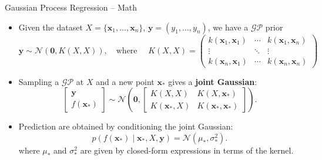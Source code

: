 \documentclass[9pt]{beamer}
\begin{document}
\begin{frame}{Gaussian Process Regression -- Math}
	\begin{itemize}
	\setlength{\itemsep}{1.4em}
	\item Given the dataset $X = \{\mathbf{x}_1,\ldots,\mathbf{x}_n\}$, $\mathbf{y} = (y_1, \ldots, y_n)$, we have a $\mathcal{GP}$ prior
		\[
			\mathbf{y} \sim \mathcal{N}(\mathbf{0}, K(X,X)), \quad \text{where } \quad
			K(X,X) = \begin{pmatrix}
				k(\mathbf{x}_1, \mathbf{x}_1) & \cdots & k(\mathbf{x}_1, \mathbf{x}_n) \\
				\vdots & \ddots & \vdots \\
				k(\mathbf{x}_n, \mathbf{x}_1) & \cdots & k(\mathbf{x}_n, \mathbf{x}_n)
			\end{pmatrix} 
		\]
	\item Sampling a $\mathcal{GP}$ at $X$ and a new point $\mathbf{x}_*$ gives a \textbf{joint Gaussian}:
		\[
		\begin{bmatrix}
		\mathbf{y} \\
		f(\mathbf{x}_*)
		\end{bmatrix}
		\sim
		\mathcal{N}
		\left(
		\mathbf{0},
		\begin{bmatrix}
			K(X,X) & K(X,\mathbf{x}_*) \\
			K(\mathbf{x}_*,X) & K(\mathbf{x}_*,\mathbf{x}_*)
		\end{bmatrix}
		\right).
		\]
	\item Prediction are obtained by conditioning the joint Gaussian:
	\[
		p(f(\mathbf{x}_*) \mid \mathbf{x}_*, X,\mathbf{y}) = \mathcal{N}(\mu_*,\sigma_*^2).
	\]
	where $\mu_*$ and $\sigma_*^2$ are given by closed-form expressions in terms of the kernel.
	\end{itemize}
\end{frame}
\end{document}
